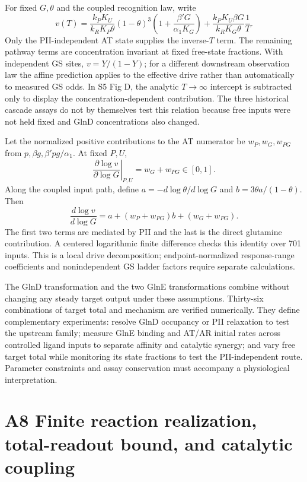 \documentclass[11pt]{article}
\begin{document}
For fixed $G,\theta$ and the coupled recognition law, write
\[
v(T)=\frac{k_PK_U}{k_RK_P\theta}(1-\theta)^3
\left(1+\frac{\beta'G}{\alpha_1K_G}\right)
+\frac{k_PK_U\beta G}{k_RK_G\theta}\frac1T.
\]
Only the PII-independent AT state supplies the inverse-$T$ term. The remaining pathway terms are concentration invariant at fixed free-state fractions. With independent GS sites, $v=Y/(1-Y)$; for a different downstream observation law the affine prediction applies to the effective drive rather than automatically to measured GS odds. In S5 Fig D, the analytic $T\to\infty$ intercept is subtracted only to display the concentration-dependent contribution. The three historical cascade assays do not by themselves test this relation because free inputs were not held fixed and GlnD concentrations also changed.

Let the normalized positive contributions to the AT numerator be $w_P,w_G,w_{PG}$ from $p,\beta g,\beta'pg/\alpha_1$. At fixed $P,U$,
\[
\left.\frac{\partial\log v}{\partial\log G}\right|_{P,U}
=w_G+w_{PG}\in[0,1].
\]
Along the coupled input path, define $a=-d\log\theta/d\log G$ and $b=3\theta a/(1-\theta)$. Then
\[
\frac{d\log v}{d\log G}=a+(w_P+w_{PG})b+(w_G+w_{PG}).
\]
The first two terms are mediated by PII and the last is the direct glutamine contribution. A centered logarithmic finite difference checks this identity over 701 inputs. This is a local drive decomposition; endpoint-normalized response-range coefficients and nonindependent GS ladder factors require separate calculations.

The GlnD transformation and the two GlnE transformations combine without changing any steady target output under these assumptions. Thirty-six combinations of target total and mechanism are verified numerically. They define complementary experiments: resolve GlnD occupancy or PII relaxation to test the upstream family; measure GlnE binding and AT/AR initial rates across controlled ligand inputs to separate affinity and catalytic synergy; and vary free target total while monitoring its state fractions to test the PII-independent route. Parameter constraints and assay conservation must accompany a physiological interpretation.


\clearpage

\clearpage
\section*{A8 Finite reaction realization, total-readout bound, and catalytic coupling}
\end{document}
